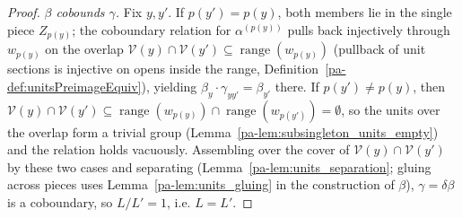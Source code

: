 \begin{proof}
  \emph{\(\beta\) cobounds \(\gamma\).} Fix \(y, y'\). If \(p(y') = p(y)\), both members lie in the
  single piece \(Z_{p(y)}\); the coboundary relation for \(\alpha^{(p(y))}\) pulls back injectively
  through \(w_{p(y)}\) on the overlap \(\mathcal V(y) \cap \mathcal V(y') \subseteq
  \operatorname{range}(w_{p(y)})\) (pullback of unit sections is injective on opens inside the
  range, Definition~\ref{pa-def:unitsPreimageEquiv}), yielding
  \(\beta_y \cdot \gamma_{yy'} = \beta_{y'}\) there. If \(p(y') \ne p(y)\), then
  \(\mathcal V(y) \cap \mathcal V(y') \subseteq \operatorname{range}(w_{p(y)}) \cap
  \operatorname{range}(w_{p(y')}) = \emptyset\), so the units over the overlap form a trivial group
  (Lemma~\ref{pa-lem:subsingleton_units_empty}) and the relation holds vacuously. Assembling over the
  cover of \(\mathcal V(y) \cap \mathcal V(y')\) by these two cases and separating
  (Lemma~\ref{pa-lem:units_separation}; gluing across pieces uses Lemma~\ref{pa-lem:units_gluing} in the
  construction of \(\beta\)), \(\gamma = \delta\beta\) is a coboundary, so \(L/L' = 1\), i.e.
  \(L = L'\).
\end{proof}

